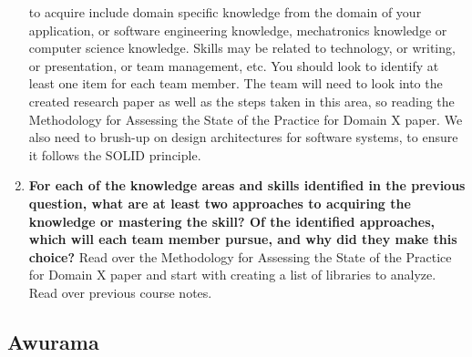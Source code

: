 \begin{enumerate}
{  to acquire include domain specific knowledge from the domain of your
  application, or software engineering knowledge, mechatronics knowledge or
  computer science knowledge.  Skills may be related to technology, or writing,
  or presentation, or team management, etc.  You should look to identify at
  least one item for each team member.}
  The team will need to look into the created research paper as well as the steps taken in this area, so reading the Methodology for Assessing the State of the Practice for Domain X paper. We also need to brush-up on design architectures for software systems, to ensure it follows the SOLID principle. 
  \item \textbf{For each of the knowledge areas and skills identified in the previous
  question, what are at least two approaches to acquiring the knowledge or
  mastering the skill?  Of the identified approaches, which will each team
  member pursue, and why did they make this choice?}
  Read over the Methodology for Assessing the State of the Practice for Domain X paper and start with creating a list of libraries to analyze. Read over previous course notes.
\end{enumerate}
\subsection*{Awurama}

